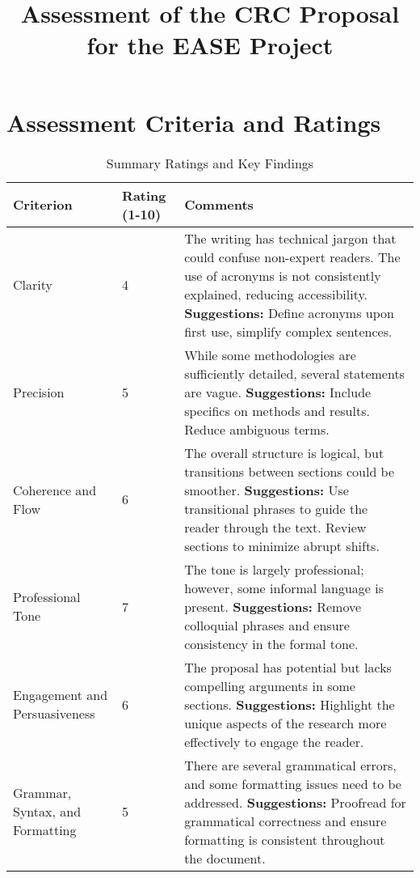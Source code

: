 \documentclass[11pt]{article}
\title{Assessment of the CRC Proposal for the EASE Project}
\author{}
\date{}
\begin{document}
\maketitle

\section{Assessment Criteria and Ratings}

\begin{table}[h]
    \centering
    \begin{tabular}{| m{5cm} | m{2cm} | m{7cm} |}
        \hline
        \textbf{Criterion} & \textbf{Rating (1-10)} & \textbf{Comments} \\
        \hline
        Clarity & 4 & The writing has technical jargon that could confuse non-expert readers. The use of acronyms is not consistently explained, reducing accessibility. \newline \textbf{Suggestions:} Define acronyms upon first use, simplify complex sentences. \\
        \hline
        Precision & 5 & While some methodologies are sufficiently detailed, several statements are vague. \newline \textbf{Suggestions:} Include specifics on methods and results. Reduce ambiguous terms. \\
        \hline
        Coherence and Flow & 6 & The overall structure is logical, but transitions between sections could be smoother. \newline \textbf{Suggestions:} Use transitional phrases to guide the reader through the text. Review sections to minimize abrupt shifts. \\
        \hline
        Professional Tone & 7 & The tone is largely professional; however, some informal language is present. \newline \textbf{Suggestions:} Remove colloquial phrases and ensure consistency in the formal tone. \\
        \hline
        Engagement and Persuasiveness & 6 & The proposal has potential but lacks compelling arguments in some sections. \newline \textbf{Suggestions:} Highlight the unique aspects of the research more effectively to engage the reader. \\
        \hline
        Grammar, Syntax, and Formatting & 5 & There are several grammatical errors, and some formatting issues need to be addressed. \newline \textbf{Suggestions:} Proofread for grammatical correctness and ensure formatting is consistent throughout the document. \\
        \hline
    \end{tabular}
    \caption{Summary Ratings and Key Findings}
\end{table}
\end{document}
